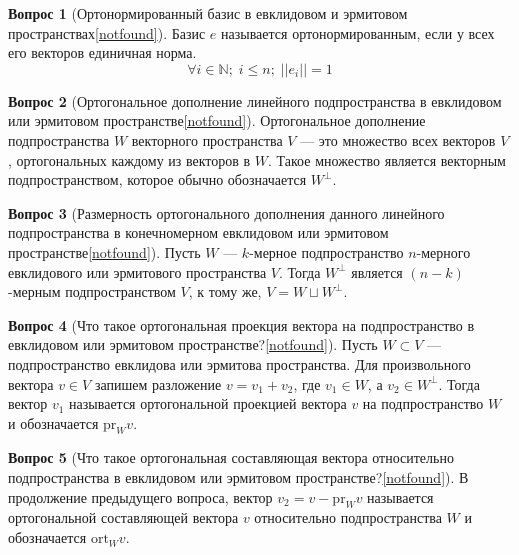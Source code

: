 \documentclass[a4paper,11pt]{article}
\theoremstyle{remark}
\theoremstyle{definition}
\newtheorem{question}{Вопрос}
\begin{document}
\begin{question}[Ортонормированный базис в евклидовом и эрмитовом пространствах\cref{notfound}]
Базис \(e\) называется ортонормированным, если у всех его векторов единичная норма.
\begin{equation*}
	\forall i \in \mathbb{N};\; i \leqslant n;\; ||e_i|| = 1
\end{equation*}
\end{question}


\begin{question}[Ортогональное дополнение линейного подпространства в евклидовом или эрмитовом пространстве\cref{notfound}]
Ортогональное дополнение подпространства \(W\) векторного пространства \(V\) --- это множество всех векторов \(V\), ортогональных каждому из векторов в \(W\). Такое множество является векторным подпространством, которое обычно обозначается \(W^{\bot}\).
\end{question}


\begin{question}[Размерность ортогонального дополнения данного линейного подпространства в конечномерном евклидовом или эрмитовом пространстве\cref{notfound}]
Пусть \(W\) --- \(k\)-мерное подпространство \(n\)-мерного евклидового или эрмитового пространства \(V\). Тогда \(W^{\bot}\) является \((n\!-\!k)\)-мерным подпространством \(V\), к тому же, \(V = W \sqcup W^{\bot}\).
\end{question}


\begin{question}[Что такое ортогональная проекция вектора на подпространство в евклидовом или эрмитовом пространстве?\cref{notfound}]
Пусть \(W \subset V\) --- подпространство евклидова или эрмитова пространства. Для произвольного вектора \(v \in V\) запишем разложение \(v = v_1 + v_2\), где \(v_1 \in W\), а \(v_2 \in W^{\bot}\). Тогда вектор \(v_1\) называется ортогональной проекцией вектора \(v\) на подпространство \(W\) и обозначается \(\mathrm{pr}_Wv\).
\end{question}


\begin{question}[Что такое ортогональная составляющая вектора относительно подпространства в евклидовом или эрмитовом пространстве?\cref{notfound}]
В продолжение предыдущего вопроса, вектор \(v_2 = v - \mathrm{pr}_Wv\) называется ортогональной составляющей вектора \(v\) относительно подпространства \(W\) и обозначается \(\mathrm{ort}_Wv\).
\end{question}
\end{document}
